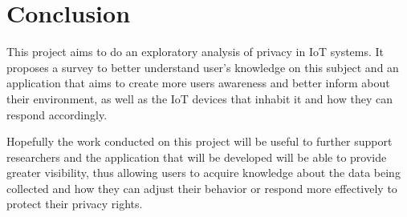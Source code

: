 %
%
\section{Conclusion}

This project aims to do an exploratory analysis of privacy in IoT systems.
It proposes a survey to better understand user's knowledge on this subject
and an application that aims to create more users awareness and better inform
about their environment, as well as the IoT devices that inhabit it and
how they can respond accordingly.

Hopefully the work conducted on this project will be useful to further support
researchers and the application that will be developed will be able to
provide greater visibility, thus allowing users to acquire knowledge about
the data being collected and how they can adjust their behavior or respond
more effectively to protect their privacy rights.
